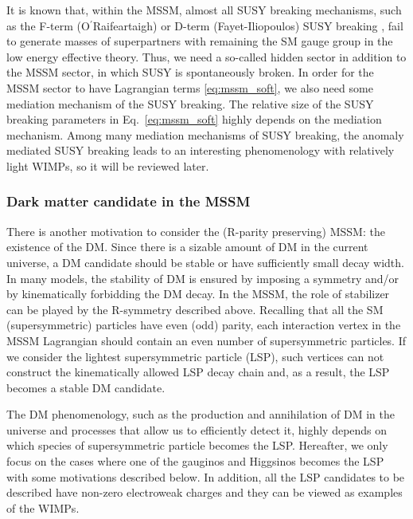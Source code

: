 \documentclass[12pt,twoside,book]{article}
\begin{document}
It is known that, within the MSSM, almost all SUSY breaking mechanisms, such as the F-term (O$^{\mathrm{\prime}}$Raifeartaigh) \cite{ORaifeartaigh:1975nky} or D-term (Fayet-Iliopoulos) SUSY breaking \cite{Fayet:1974jb, Fayet:1974pd}, fail to generate masses of superpartners with remaining the SM gauge group in the low energy effective theory.
Thus, we need a so-called hidden sector in addition to the MSSM sector, in which SUSY is spontaneously broken.
In order for the MSSM sector to have Lagrangian terms \eqref{eq:mssm_soft}, we also need some mediation mechanism of the SUSY breaking.
The relative size of the SUSY breaking parameters in Eq.~\eqref{eq:mssm_soft} highly depends on the mediation mechanism.
Among many mediation mechanisms of SUSY breaking, the anomaly mediated SUSY breaking \cite{Giudice:1998xp, Randall:1998uk} leads to an interesting phenomenology with relatively light WIMPs, so it will be reviewed later.


\subsubsection*{Dark matter candidate in the MSSM}

There is another motivation to consider the (R-parity preserving) MSSM: the existence of the DM.
Since there is a sizable amount of DM in the current universe, a DM candidate should be stable or have sufficiently small decay width.
In many models, the stability of DM is ensured by imposing a symmetry and/or by kinematically forbidding the DM decay.
In the MSSM, the role of stabilizer can be played by the R-symmetry described above.
Recalling that all the SM (supersymmetric) particles have even (odd) parity, each interaction vertex in the MSSM Lagrangian should contain an even number of supersymmetric particles.
If we consider the lightest supersymmetric particle (LSP), such vertices can not construct the kinematically allowed LSP decay chain and, as a result, the LSP becomes a stable DM candidate.

The DM phenomenology, such as the production and annihilation of DM in the universe and processes that allow us to efficiently detect it, highly depends on which species of supersymmetric particle becomes the LSP.
Hereafter, we only focus on the cases where one of the gauginos and Higgsinos becomes the LSP with some motivations described below.
In addition, all the LSP candidates to be described have non-zero electroweak charges and they can be viewed as examples of the WIMPs.
\end{document}
